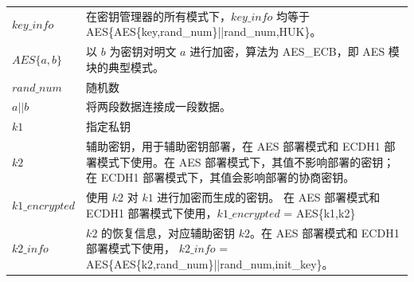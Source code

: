 \documentclass[main\_\_CN.tex]{subfiles}
\begin{document}
\begin{longtable}[c]{ R{6cm} p{10cm} }
\begin{math}key\_info\end{math}\label{para:keyinfo} & 在密钥管理器的所有模式下，\begin{math}key\_info\end{math} 均等于 AES\{AES\{key,rand\_num\}||rand\_num,HUK\}。\\
\begin{math}AES\{a,b\}\end{math} & 以 \begin{math}b\end{math} 为密钥对明文 \begin{math}a\end{math} 进行加密，算法为 AES\_ECB，即 AES 模块的典型模式。\\
\begin{math}rand\_num\end{math} & 随机数\\
\begin{math}a||b\end{math} & 将两段数据连接成一段数据。\\
\begin{math}k1\end{math}\label{para:k1} & 指定私钥 \\
\begin{math}k2\end{math}\label{para:k2} & 辅助密钥，用于辅助密钥部署，在 AES 部署模式和 ECDH1 部署模式下使用。在 AES 部署模式下，其值不影响部署的密钥；在 ECDH1 部署模式下，其值会影响部署的协商密钥。\\ 
\begin{math}k1\_encrypted\end{math}\label{para:k1enc} & 使用 \begin{math}k2\end{math} 对 \begin{math}k1\end{math} 进行加密而生成的密钥。 在 AES 部署模式和 ECDH1 部署模式下使用，\begin{math}k1\_encrypted\end{math} = AES\{k1,k2\}\\
\begin{math}k2\_info\end{math}\label{para:k2info} & \begin{math}k2\end{math} 的恢复信息，对应辅助密钥 \begin{math}k2\end{math}。在 AES 部署模式和 ECDH1 部署模式下使用， \begin{math}k2\_info\end{math} = AES\{AES\{k2,rand\_num\}||rand\_num,init\_key\}。\\

\end{longtable}
\end{document}
